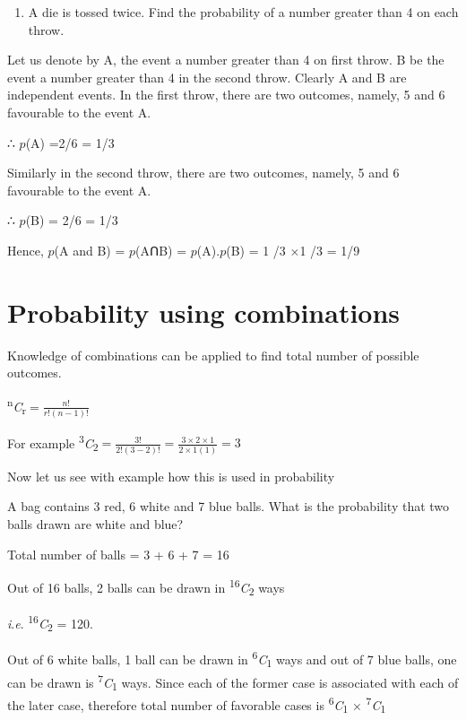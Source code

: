 \documentclass[
]{book}
\providecommand{\tightlist}{%
  \setlength{\itemsep}{0pt}\setlength{\parskip}{0pt}}
\begin{document}
\begin{enumerate}
\def\labelenumi{\arabic{enumi}.}
\setcounter{enumi}{2}
\tightlist
\item
  A die is tossed twice. Find the probability of a number greater than 4 on each throw.
\end{enumerate}

Let us denote by A, the event \textquotesingle a number greater than 4\textquotesingle{} on first throw. B be the event \textquotesingle a number greater than 4\textquotesingle{} in the second throw. Clearly A and B are independent events. In the first throw, there are two outcomes, namely, 5 and 6 favourable to the event A.

∴ \(p\)(A) =2/6 = 1/3

Similarly in the second throw, there are two outcomes, namely, 5 and 6 favourable to the event A.

∴ \(p\)(B) = 2/6 = 1/3

Hence, \(p\)(A and B) = \(p\)(AꓵB) = \(p\)(A).\(p\)(B) = 1 /3 ×1 /3 = 1/9

\hypertarget{probability-using-combinations}{%
\section*{Probability using combinations}\label{probability-using-combinations}}

Knowledge of combinations can be applied to find total number of possible outcomes.

\textsuperscript{n}\emph{C}\textsubscript{r}\(= \frac{n!}{r!(n - 1)!}\)

For example
\textsuperscript{3}\emph{C}\textsubscript{2}\(= \frac{3!}{2!(3 - 2)!} = \frac{3 \times 2 \times 1}{2 \times 1(1)} = 3\)

Now let us see with example how this is used in probability

A bag contains 3 red, 6 white and 7 blue balls. What is the probability that two balls drawn are white and blue?

Total number of balls = 3 + 6 + 7 = 16

Out of 16 balls, 2 balls can be drawn in \textsuperscript{16}\emph{C}\textsubscript{2} ways

\emph{i}.\emph{e}. \textsuperscript{16}\emph{C}\textsubscript{2} = 120.

Out of 6 white balls, 1 ball can be drawn in \textsuperscript{6}\emph{C}\textsubscript{1} ways and out of 7 blue balls, one can be drawn is \textsuperscript{7}\emph{C}\textsubscript{1} ways. Since each of the former case is associated with each of the later case, therefore total number of favorable cases is \textsuperscript{6}\emph{C}\textsubscript{1} × \textsuperscript{7}\emph{C}\textsubscript{1}
\end{document}
